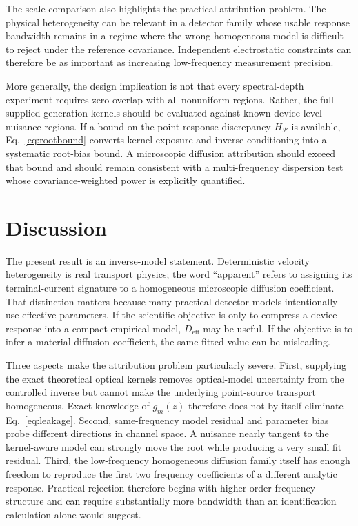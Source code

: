 \documentclass[aps,pra,twocolumn,superscriptaddress,nofootinbib]{revtex4-2}
\newcommand{\Deff}{D_{\mathrm{eff}}}
\newcommand{\Rregion}{\mathcal{R}}
\begin{document}
The scale comparison also highlights the practical attribution problem. The physical heterogeneity can be relevant in a detector family whose usable response bandwidth remains in a regime where the wrong homogeneous model is difficult to reject under the reference covariance. Independent electrostatic constraints can therefore be as important as increasing low-frequency measurement precision.

More generally, the design implication is not that every spectral-depth experiment requires zero overlap with all nonuniform regions. Rather, the full supplied generation kernels should be evaluated against known device-level nuisance regions. If a bound on the point-response discrepancy $H_{\Rregion}$ is available, Eq.~\eqref{eq:rootbound} converts kernel exposure and inverse conditioning into a systematic root-bias bound. A microscopic diffusion attribution should exceed that bound and should remain consistent with a multi-frequency dispersion test whose covariance-weighted power is explicitly quantified.

\section{Discussion}\label{sec:discussion}

The present result is an inverse-model statement. Deterministic velocity heterogeneity is real transport physics; the word ``apparent'' refers to assigning its terminal-current signature to a homogeneous microscopic diffusion coefficient. That distinction matters because many practical detector models intentionally use effective parameters. If the scientific objective is only to compress a device response into a compact empirical model, $\Deff$ may be useful. If the objective is to infer a material diffusion coefficient, the same fitted value can be misleading.

Three aspects make the attribution problem particularly severe. First, supplying the exact theoretical optical kernels removes optical-model uncertainty from the controlled inverse but cannot make the underlying point-source transport homogeneous. Exact knowledge of $g_m(z)$ therefore does not by itself eliminate Eq.~\eqref{eq:leakage}. Second, same-frequency model residual and parameter bias probe different directions in channel space. A nuisance nearly tangent to the kernel-aware model can strongly move the root while producing a very small fit residual. Third, the low-frequency homogeneous diffusion family itself has enough freedom to reproduce the first two frequency coefficients of a different analytic response. Practical rejection therefore begins with higher-order frequency structure and can require substantially more bandwidth than an identification calculation alone would suggest.
\end{document}
